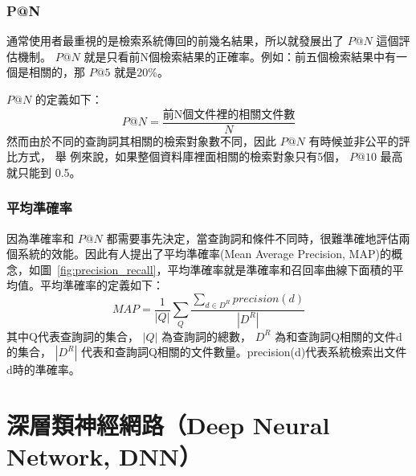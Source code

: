 \subsubsection{P@N}

通常使用者最重視的是檢索系統傳回的前幾名結果，所以就發展出了 $ P@N $ 這個評估機制。 $ P@N $ 就是只看前N個檢索結果的正確率。例如：前五個檢索結果中有一個是相關的，那 $ P@5 $ 就是20\%。

 $ P@N $ 的定義如下：
\[
P@N=\frac{\text{前N個文件裡的相關文件數}}{N}
\]
 然而由於不同的查詢詞其相關的檢索對象數不同，因此  $ P@N $  有時候並非公平的評比方式， 舉
 例來說，如果整個資料庫裡面相關的檢索對象只有5個，  $ P@10 $  最高就只能到
 0.5。
\subsubsection{平均準確率~\cite{garofolo2000trec}}

因為準確率和 $ P@N $ 都需要事先決定，當查詢詞和條件不同時，很難準確地評估兩個系統的效能。因此有人提出了平均準確率(Mean Average Precision, MAP)的概念，如圖~\ref{fig:precision_recall}，平均準確率就是準確率和召回率曲線下面積的平均值。平均準確率的定義如下：
\begin{equation}
MAP = \frac{1}{|Q|} \sum_Q \frac{\sum_{d \in D^R}precision(d)}{|D^R|}
\end{equation}
其中Q代表查詢詞的集合， $ |Q| $ 為查詢詞的總數， $ D^R $ 為和查詢詞Q相關的文件d的集合， $ |D^R| $ 代表和查詢詞Q相關的文件數量。precision(d)代表系統檢索出文件d時的準確率。




\section{深層類神經網路（Deep Neural Network, DNN）}
\label{DNN}
